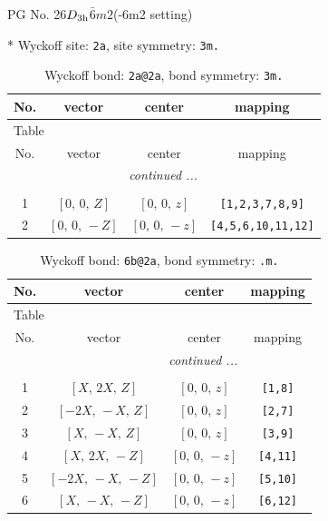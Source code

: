 \documentclass[fleqn,8pt]{jsarticle}
\begin{document}
\setcounter{MaxMatrixCols}{32}

\renewcommand{\tablename}{Table~}
\renewcommand{\figurename}{Figure~}
\begin{center}
\LARGE
PG No. 26\quad$D_{\rm 3h}$\quad$\bar{6}m2$\quad(-6m2 setting)\quad[ hexagonal ]
\end{center}


* Wyckoff site: {\tt 2a}, site symmetry: {\tt 3m.}
\renewcommand{\arraystretch}{1.2}
\begin{longtable}{cccc}
\caption{Wyckoff bond: {\tt 2a@2a}, bond symmetry: {\tt 3m.}}
 \\
 \hline \hline
No. & vector & center & mapping \\ \hline \endfirsthead

\multicolumn{3}{l}{\tablename\ \thetable{}} \\
 \hline \hline
No. & vector & center & mapping \\ \hline \endhead

 \hline \hline
\multicolumn{3}{r}{\footnotesize\it continued ...} \\ \endfoot

 \hline \hline
\multicolumn{3}{r}{} \\ \endlastfoot

1 & $\left[ 0,\, 0,\, Z \right]$ & $\left[ 0,\, 0,\, z \right]$ & {\tt [1,2,3,7,8,9]} \\ \hline
2 & $\left[ 0,\, 0,\, - Z \right]$ & $\left[ 0,\, 0,\, - z \right]$ & {\tt [4,5,6,10,11,12]} \\
\end{longtable}
\renewcommand{\arraystretch}{1.2}
\begin{longtable}{cccc}
\caption{Wyckoff bond: {\tt 6b@2a}, bond symmetry: {\tt .m.}}
 \\
 \hline \hline
No. & vector & center & mapping \\ \hline \endfirsthead

\multicolumn{3}{l}{\tablename\ \thetable{}} \\
 \hline \hline
No. & vector & center & mapping \\ \hline \endhead

 \hline \hline
\multicolumn{3}{r}{\footnotesize\it continued ...} \\ \endfoot

 \hline \hline
\multicolumn{3}{r}{} \\ \endlastfoot

1 & $\left[ X,\, 2 X,\, Z \right]$ & $\left[ 0,\, 0,\, z \right]$ & {\tt [1,8]} \\ \hline
2 & $\left[ - 2 X,\, - X,\, Z \right]$ & $\left[ 0,\, 0,\, z \right]$ & {\tt [2,7]} \\ \hline
3 & $\left[ X,\, - X,\, Z \right]$ & $\left[ 0,\, 0,\, z \right]$ & {\tt [3,9]} \\ \hline
4 & $\left[ X,\, 2 X,\, - Z \right]$ & $\left[ 0,\, 0,\, - z \right]$ & {\tt [4,11]} \\ \hline
5 & $\left[ - 2 X,\, - X,\, - Z \right]$ & $\left[ 0,\, 0,\, - z \right]$ & {\tt [5,10]} \\ \hline
6 & $\left[ X,\, - X,\, - Z \right]$ & $\left[ 0,\, 0,\, - z \right]$ & {\tt [6,12]} \\
\end{longtable}
\end{document}
